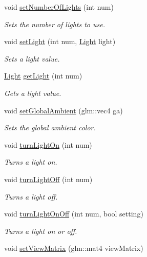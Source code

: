 \begin{DoxyCompactItemize}
void \hyperlink{class_obj_model_a99417a3c2103544059483d601959bf35}{set\+Number\+Of\+Lights} (int num)
\begin{DoxyCompactList}\small\item\em Sets the number of lights to use. \end{DoxyCompactList}\item 
void \hyperlink{class_obj_model_abe58ee93a5a91f88c52f7b28c1fa6723}{set\+Light} (int num, \hyperlink{class_light}{Light} light)
\begin{DoxyCompactList}\small\item\em Sets a light value. \end{DoxyCompactList}\item 
\hyperlink{class_light}{Light} \hyperlink{class_obj_model_adadab74f1605b3f1b6b778f6c78a8796}{get\+Light} (int num)
\begin{DoxyCompactList}\small\item\em Gets a light value. \end{DoxyCompactList}\item 
void \hyperlink{class_obj_model_a3fc48bd65930bf35da9d44aef4cd3313}{set\+Global\+Ambient} (glm\+::vec4 ga)
\begin{DoxyCompactList}\small\item\em Sets the global ambient color. \end{DoxyCompactList}\item 
void \hyperlink{class_obj_model_a14bb9c395cd453db4be2a8fdfeb57ae8}{turn\+Light\+On} (int num)
\begin{DoxyCompactList}\small\item\em Turns a light on. \end{DoxyCompactList}\item 
void \hyperlink{class_obj_model_abd41d77a204c443fd9f2bd94cda3a514}{turn\+Light\+Off} (int num)
\begin{DoxyCompactList}\small\item\em Turns a light off. \end{DoxyCompactList}\item 
void \hyperlink{class_obj_model_a17a3c9348453c872b3d90c880a49098d}{turn\+Light\+On\+Off} (int num, bool setting)
\begin{DoxyCompactList}\small\item\em Turns a light on or off. \end{DoxyCompactList}\item 
void \hyperlink{class_obj_model_a579f8130f3f30d9a0bc8e8add3d585ed}{set\+View\+Matrix} (glm\+::mat4 view\+Matrix)

\end{DoxyCompactItemize}
